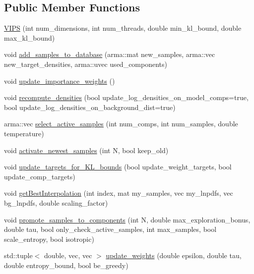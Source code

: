 \subsection*{Public Member Functions}
\begin{DoxyCompactItemize}
\item 
\hyperlink{classVIPS_a7ee36787e1dd8d0ae04365ed652ab338}{V\+I\+PS} (int num\+\_\+dimensions, int num\+\_\+threads, double min\+\_\+kl\+\_\+bound, double max\+\_\+kl\+\_\+bound)
\item 
void \hyperlink{classVIPS_adff46a3464207e55c4e699e6d869d40f}{add\+\_\+samples\+\_\+to\+\_\+database} (arma\+::mat new\+\_\+samples, arma\+::vec new\+\_\+target\+\_\+densities, arma\+::uvec used\+\_\+components)
\item 
void \hyperlink{classVIPS_a94e0f8c6ea5cc72da5939874dcaddb1e}{update\+\_\+importance\+\_\+weights} ()
\item 
void \hyperlink{classVIPS_a8e90dcdcf50ffca10fbb9dbfd8176e22}{recompute\+\_\+densities} (bool update\+\_\+log\+\_\+densities\+\_\+on\+\_\+model\+\_\+comps=true, bool update\+\_\+log\+\_\+densities\+\_\+on\+\_\+background\+\_\+dist=true)
\item 
arma\+::vec \hyperlink{classVIPS_aea329d5f4eaf1c406b0c747b6390321a}{select\+\_\+active\+\_\+samples} (int num\+\_\+comps, int num\+\_\+samples, double temperature)
\item 
void \hyperlink{classVIPS_a9d39ea354e713a822f3a095a4f989413}{activate\+\_\+newest\+\_\+samples} (int N, bool keep\+\_\+old)
\item 
void \hyperlink{classVIPS_a6e88b8a4ffd410ee100455458b5d9e3b}{update\+\_\+targets\+\_\+for\+\_\+\+K\+L\+\_\+bounds} (bool update\+\_\+weight\+\_\+targets, bool update\+\_\+comp\+\_\+targets)
\item 
void \hyperlink{classVIPS_af23752b3d9fce422b6b26456240113c2}{get\+Best\+Interpolation} (int index, mat my\+\_\+samples, vec my\+\_\+lnpdfs, vec bg\+\_\+lnpdfs, double scaling\+\_\+factor)
\item 
void \hyperlink{classVIPS_a905ac8d65a5e88bb40220221d0942778}{promote\+\_\+samples\+\_\+to\+\_\+components} (int N, double max\+\_\+exploration\+\_\+bonus, double tau, bool only\+\_\+check\+\_\+active\+\_\+samples, int max\+\_\+samples, bool scale\+\_\+entropy, bool isotropic)
\item 
std\+::tuple$<$ double, vec, vec $>$ \hyperlink{classVIPS_a6619407df7cc5032156caf8fb1855e95}{update\+\_\+weights} (double epsilon, double tau, double entropy\+\_\+bound, bool be\+\_\+greedy)
\item 

\end{DoxyCompactItemize}
